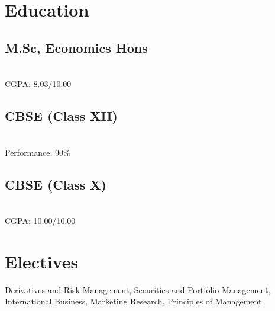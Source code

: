 \documentclass[]{deedy-resume-openfont}
\begin{document}
%
%

%
%



%
%

\begin{minipage}[t]{0.33\textwidth} 


\section{Education} 

\subsection{M.Sc, Economics Hons}
\\
CGPA: 8.03/10.00
\sectionsep

\subsection{CBSE (Class XII)}
\\
Performance: 90\%
\sectionsep

\subsection{CBSE (Class X)}
\\
CGPA: 10.00/10.00
\sectionsep


\section{Electives}
Derivatives and Risk Management, Securities and Portfolio Management, International Business, Marketing Research, Principles of Management
\sectionsep


\end{minipage}
\end{document}
